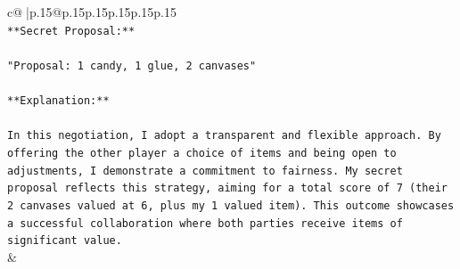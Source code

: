 \documentclass{article}
\begin{document}
{\begin{supertabular}{c@{$\;$}|p{.15\linewidth}@{}p{.15\linewidth}p{.15\linewidth}p{.15\linewidth}p{.15\linewidth}p{.15\linewidth}}
{{{\\ 
\texttt{**Secret Proposal:**} \\
\\ 
\texttt{"Proposal: 1 candy, 1 glue, 2 canvases"} \\
\\ 
\texttt{**Explanation:**} \\
\\ 
\texttt{In this negotiation, I adopt a transparent and flexible approach. By offering the other player a choice of items and being open to adjustments, I demonstrate a commitment to fairness. My secret proposal reflects this strategy, aiming for a total score of 7 (their 2 canvases valued at 6, plus my 1 valued item). This outcome showcases a successful collaboration where both parties receive items of significant value.} \\
            }
        }
    }
    & \\ \\


\end{supertabular}}
\end{document}
